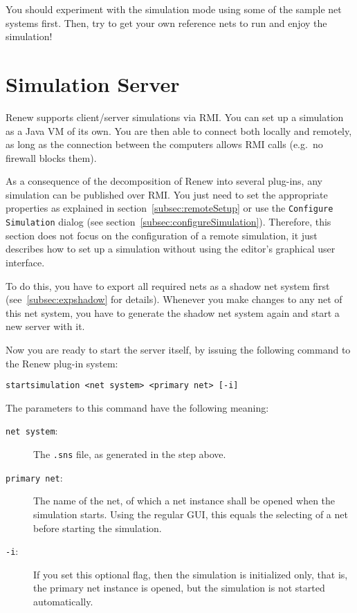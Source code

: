 You should experiment with the simulation mode using some of the
sample net systems first. Then, try to get your own reference nets
to run and enjoy the simulation!


\section{Simulation Server}
\label{sec:simulationServer}

Renew supports client/server simulations via RMI. You can set up
a simulation as a Java VM of its own. You are then able to connect
both locally and remotely, as long as the connection between the
computers allows RMI calls (e.g.\ no firewall blocks them).

As a consequence of the decomposition of Renew
into several plug-ins, any simulation can be published over RMI.
You just need to set the appropriate properties as explained in
section~\ref{subsec:remoteSetup} or use the \texttt{Configure 
Simulation} dialog (see
section~\ref{subsec:configureSimulation}).
Therefore, this section does not focus on the configuration of a
remote simulation, it just describes how to set up a simulation
without using the editor's graphical user interface.

To do this, you have to export all required nets as a shadow
net system first (see~\ref{subsec:expshadow} for details). Whenever you make
changes to any net of this net system, you have to generate the
shadow net system again and start a new server with it.

Now you are ready to start the server itself, by issuing the
following command to the Renew plug-in system:
\begin{lstlisting}[style=xnonfloating]
  startsimulation <net system> <primary net> [-i]
\end{lstlisting}
The parameters to this command have the following meaning:
\begin{description}
        \item[\texttt{\mbox{net system}}:]
                The \texttt{.sns} file, as generated in the step above.
        \item[\texttt{\mbox{primary net}}:]
                The name of the net, of which a net instance shall be opened when the simulation starts. Using the regular GUI, this equals the selecting of a net before starting the simulation.
        \item[\texttt{\mbox{-i}}:] If you set this optional
                flag, then the simulation is initialized only, that
                is, the primary net instance is opened, but the
                simulation is not started automatically.
\end{description}

